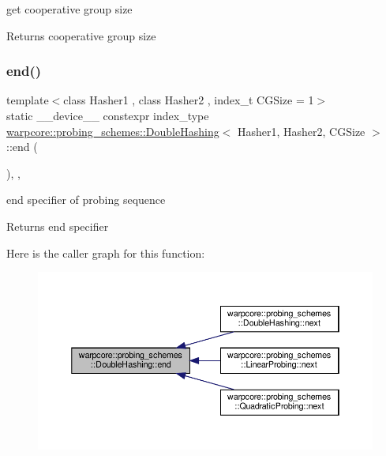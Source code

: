 get cooperative group size 

\begin{DoxyReturn}{Returns}
cooperative group size 
\end{DoxyReturn}
\mbox{\label{classwarpcore_1_1probing__schemes_1_1DoubleHashing_ac9ee12c8aa2a976f3fd2cdee3bac4957}} 
\subsubsection{\texorpdfstring{end()}{end()}}
{\footnotesize\ttfamily template$<$class Hasher1 , class Hasher2 , index\+\_\+t C\+G\+Size = 1$>$ \\
static \+\_\+\+\_\+device\+\_\+\+\_\+ constexpr index\+\_\+type \hyperlink{classwarpcore_1_1probing__schemes_1_1DoubleHashing}{warpcore\+::probing\+\_\+schemes\+::\+Double\+Hashing}$<$ Hasher1, Hasher2, C\+G\+Size $>$\+::end (\begin{DoxyParamCaption}{ }\end{DoxyParamCaption})\hspace{0.3cm}{\ttfamily [inline]}, {\ttfamily [static]}, {\ttfamily [noexcept]}}



end specifier of probing sequence 

\begin{DoxyReturn}{Returns}
end specifier 
\end{DoxyReturn}
Here is the caller graph for this function\+:
\nopagebreak
\begin{figure}[H]
\begin{center}
\leavevmode
\includegraphics[width=350pt]{classwarpcore_1_1probing__schemes_1_1DoubleHashing_ac9ee12c8aa2a976f3fd2cdee3bac4957_icgraph}
\end{center}
\end{figure}
\mbox{\label{classwarpcore_1_1probing__schemes_1_1DoubleHashing_a49bf8de6c8af2e84d335e62a864a1a75}} 
